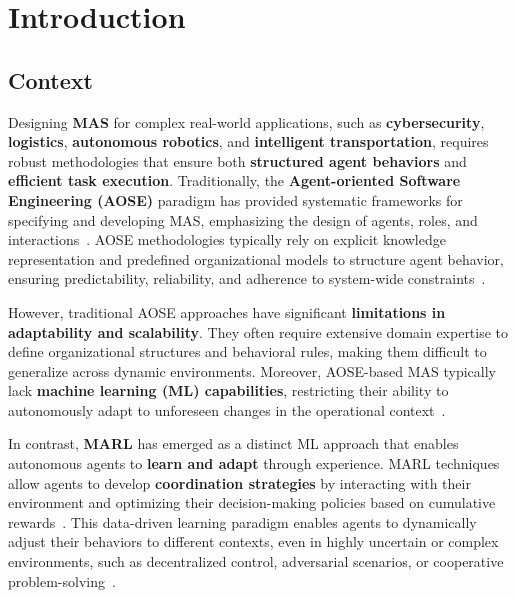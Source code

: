 \documentclass[pdflatex,sn-mathphys-num]{sn-jnl}%
\theoremstyle{thmstyleone}%
\theoremstyle{thmstyletwo}%
\theoremstyle{thmstylethree}%
\begin{document}




\maketitle

\section{Introduction}

\subsection{Context}

Designing \textbf{MAS} for complex real-world applications, such as \textbf{cybersecurity}, \textbf{logistics}, \textbf{autonomous robotics}, and \textbf{intelligent transportation}, requires robust methodologies that ensure both \textbf{structured agent behaviors} and \textbf{efficient task execution}. Traditionally, the \textbf{Agent-oriented Software Engineering (AOSE)} paradigm has provided systematic frameworks for specifying and developing MAS, emphasizing the design of agents, roles, and interactions~\cite{Pavon2003, Bernon2005}. AOSE methodologies typically rely on explicit knowledge representation and predefined organizational models to structure agent behavior, ensuring predictability, reliability, and adherence to system-wide constraints~\cite{Hindriks2014}.

However, traditional AOSE approaches have significant \textbf{limitations in adaptability and scalability}. They often require extensive domain expertise to define organizational structures and behavioral rules, making them difficult to generalize across dynamic environments. Moreover, AOSE-based MAS typically lack \textbf{machine learning (ML) capabilities}, restricting their ability to autonomously adapt to unforeseen changes in the operational context~\cite{Garcia2004}.

In contrast, \textbf{MARL} has emerged as a distinct ML approach that enables autonomous agents to \textbf{learn and adapt} through experience. MARL techniques allow agents to develop \textbf{coordination strategies} by interacting with their environment and optimizing their decision-making policies based on cumulative rewards~\cite{Zhang2021}. This data-driven learning paradigm enables agents to dynamically adjust their behaviors to different contexts, even in highly uncertain or complex environments, such as decentralized control, adversarial scenarios, or cooperative problem-solving~\cite{Papoudakis2021}.
\end{document}
